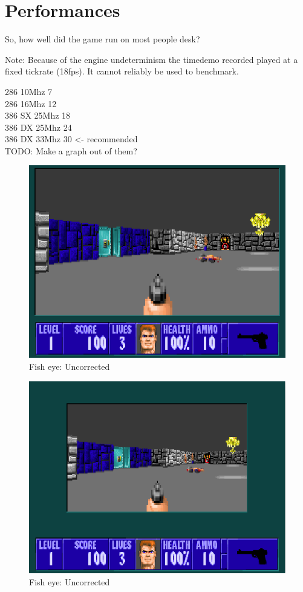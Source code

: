 \section{Performances}
So, how well did the game run on most people desk?

Note: Because of the engine undeterminism the timedemo recorded played at a fixed tickrate (18fps). It cannot reliably be used to benchmark.

286 10Mhz 7 \\
286 16Mhz 12 \\
386 SX 25Mhz  18 \\
386 DX 25Mhz 24 \\
386 DX 33Mhz 30 <- recommended \\

TODO: Make a graph out of them?

  \begin{figure}[H]
\centering
 \includegraphics[width=\textwidth]{screenshots/adjust_view/100.png}
  \caption{Fish eye: Uncorrected} 
 \end{figure}
 \par

   \begin{figure}[H]
\centering
 \includegraphics[width=\textwidth]{screenshots/adjust_view/50.png}
  \caption{Fish eye: Uncorrected} 
 \end{figure}
 \par

